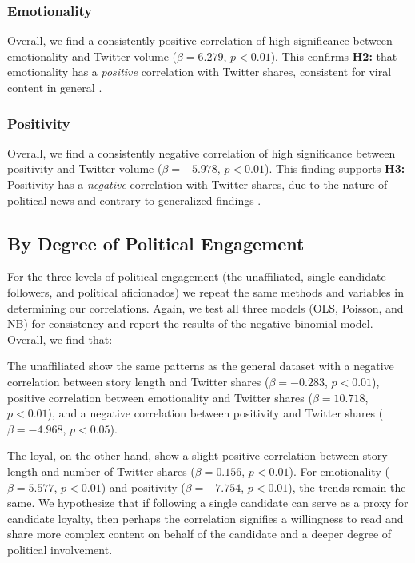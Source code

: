 \documentclass[letterpaper]{article}
\begin{document}
\subsubsection{Emotionality}
Overall, we find a consistently positive correlation of high significance between emotionality and Twitter volume ($\beta=6.279$, $p<0.01$). This confirms \textbf{H2:} that emotionality has a \emph{positive} correlation with Twitter shares, consistent for viral content in general \cite{berger2012makes}.

\subsubsection{Positivity}
Overall, we find a consistently negative correlation of high significance between positivity and Twitter volume ($\beta=−5.978$, $p<0.01$). This finding supports \textbf{H3:} Positivity has a \emph{negative} correlation with Twitter shares, due to the nature of political news and contrary to generalized findings \cite{berger2012makes, hansen2011good}.

\subsection{By Degree of Political Engagement}
For the three levels of political engagement (the unaffiliated, single-candidate followers, and political aficionados) we repeat the same methods and variables in determining our correlations. Again, we test all three models (OLS, Poisson, and NB) for consistency and report the results of the negative binomial model. Overall, we find that: 

The unaffiliated show the same patterns as the general dataset with a negative correlation between story length and Twitter shares ($\beta=-0.283$, $p<0.01$), positive correlation between emotionality and Twitter shares ($\beta=10.718$, $p<0.01$), and a negative correlation between positivity and Twitter shares ($\beta=-4.968$, $p<0.05$).

The loyal, on the other hand, show a slight positive correlation between story length and number of Twitter shares ($\beta=0.156$, $p<0.01$). For emotionality ($\beta=5.577$, $p<0.01$) and positivity ($\beta=-7.754$, $p<0.01$), the trends remain the same. We hypothesize that if following a single candidate can serve as a proxy for candidate loyalty, then perhaps the correlation signifies a willingness to read and share more complex content on behalf of the candidate and a deeper degree of political involvement.
\end{document}

